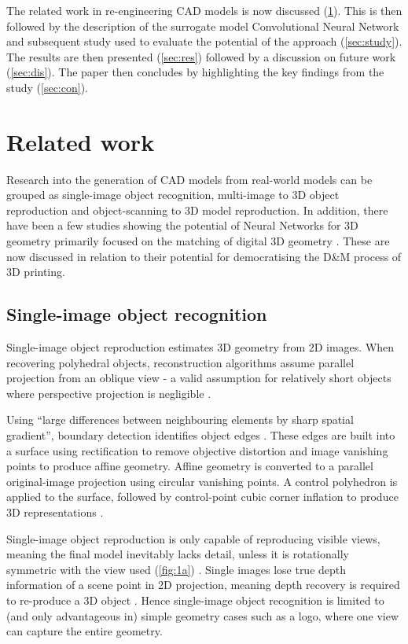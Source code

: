 \documentclass[a4paper, 11pt]{article}
\begin{document}
The related work in re-engineering CAD models is now discussed (\cref{sec:rel}). This is then followed by the description of the surrogate model Convolutional Neural Network and subsequent study used to evaluate the potential of the approach (\cref{sec:study}).
The results are then presented (\cref{sec:res}) followed by a discussion on future work (\cref{sec:dis}). The paper then concludes by highlighting the key findings from the study (\cref{sec:con}).

\section{Related work}\label{sec:rel}

Research into the generation of CAD models from real-world models can be grouped as single-image object recognition, multi-image to 3D object reproduction and object-scanning to 3D model reproduction. In addition, there have been a few studies showing the potential of Neural Networks for 3D geometry primarily focused on the matching of digital 3D geometry \parencite{zaki2016,maturana2015}. These are now discussed in relation to their potential for democratising the D\&M process of 3D printing.

\subsection{Single-image object recognition}

Single-image object reproduction estimates 3D geometry from 2D images. When recovering polyhedral objects, reconstruction algorithms assume parallel projection from an oblique view - a valid assumption for relatively short objects where perspective projection is negligible \parencite{lee2011}.

Using ``large differences between neighbouring elements by sharp spatial gradient'', boundary detection identifies object edges \parencite{liu2005}. 
These edges are built into a surface using rectification to remove objective distortion and image vanishing points to produce affine geometry.
Affine geometry is converted to a parallel original-image projection using circular vanishing points. A control polyhedron is applied to the surface, followed by control-point cubic corner inflation to produce 3D representations \parencite{jha2014}.

Single-image object reproduction is only capable of reproducing visible views, meaning the final model inevitably lacks detail, unless it is rotationally symmetric with the view used (\cref{fig:1a}) \parencite{van19983d}. 
Single images lose true depth information of a scene point in 2D projection, meaning depth recovery is required to re-produce a 3D object \parencite{liu2005}. 
Hence single-image object recognition is limited to (and only advantageous in) simple geometry cases such as a logo, where one view can capture the entire geometry.
\end{document}

